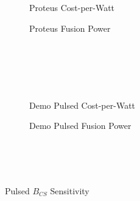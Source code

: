 \begin{figure*}
    \centering
    \hfill 
    \begin{subfigure}[t]{0.45\textwidth}
        \centering
		\begin{adjustbox}{width=\textwidth}
			\Large
			
		\end{adjustbox}
        \caption{Proteus Cost-per-Watt}
    \end{subfigure}
    \hfill
    \begin{subfigure}[t]{0.45\textwidth}
        \centering
		\begin{adjustbox}{width=\textwidth}
			\Large
			
		\end{adjustbox}
        \caption{Proteus Fusion Power}
    \end{subfigure}
    \hfill \hfill ~\\ ~\\ ~\\ ~\\
    \hfill 
    \begin{subfigure}[t]{0.45\textwidth}
        \centering
		\begin{adjustbox}{width=\textwidth}
			\Large
			
		\end{adjustbox}
        \caption{Demo Pulsed Cost-per-Watt}
    \end{subfigure}
    \hfill
    \begin{subfigure}[t]{0.45\textwidth}
        \centering
		\begin{adjustbox}{width=\textwidth}
			\Large
			
		\end{adjustbox}
        \caption{Demo Pulsed Fusion Power}
    \end{subfigure}	
    \hfill \hfill ~\\ ~\\ ~\\
    \caption{Pulsed $B_{CS}$ Sensitivity}
    \label{fig:pulsed_sensitivities}
\end{figure*}

